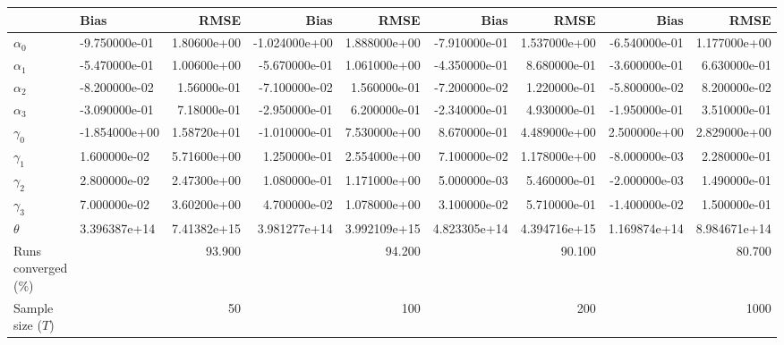 
\begin{tabular}[t]{llrrrrrrr}
\toprule
  & Bias & RMSE & Bias & RMSE & Bias & RMSE & Bias & RMSE\\
\midrule
$\alpha_{0}$ & -9.750000e-01 & 1.80600e+00 & -1.024000e+00 & 1.888000e+00 & -7.910000e-01 & 1.537000e+00 & -6.540000e-01 & 1.177000e+00\\
$\alpha_{1}$ & -5.470000e-01 & 1.00600e+00 & -5.670000e-01 & 1.061000e+00 & -4.350000e-01 & 8.680000e-01 & -3.600000e-01 & 6.630000e-01\\
$\alpha_{2}$ & -8.200000e-02 & 1.56000e-01 & -7.100000e-02 & 1.560000e-01 & -7.200000e-02 & 1.220000e-01 & -5.800000e-02 & 8.200000e-02\\
$\alpha_{3}$ & -3.090000e-01 & 7.18000e-01 & -2.950000e-01 & 6.200000e-01 & -2.340000e-01 & 4.930000e-01 & -1.950000e-01 & 3.510000e-01\\
$\gamma_{0}$ & -1.854000e+00 & 1.58720e+01 & -1.010000e-01 & 7.530000e+00 & 8.670000e-01 & 4.489000e+00 & 2.500000e+00 & 2.829000e+00\\
$\gamma_{1}$ & 1.600000e-02 & 5.71600e+00 & 1.250000e-01 & 2.554000e+00 & 7.100000e-02 & 1.178000e+00 & -8.000000e-03 & 2.280000e-01\\
$\gamma_{2}$ & 2.800000e-02 & 2.47300e+00 & 1.080000e-01 & 1.171000e+00 & 5.000000e-03 & 5.460000e-01 & -2.000000e-03 & 1.490000e-01\\
$\gamma_{3}$ & 7.000000e-02 & 3.60200e+00 & 4.700000e-02 & 1.078000e+00 & 3.100000e-02 & 5.710000e-01 & -1.400000e-02 & 1.500000e-01\\
$\theta$ & 3.396387e+14 & 7.41382e+15 & 3.981277e+14 & 3.992109e+15 & 4.823305e+14 & 4.394716e+15 & 1.169874e+14 & 8.984671e+14\\
Runs converged (\%) &  & 93.900 &  & 94.200 &  & 90.100 &  & 80.700\\
Sample size ($T$) &  & 50 &  & 100 &  & 200 &  & 1000\\
\bottomrule
\end{tabular}
